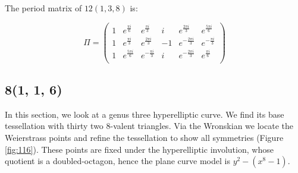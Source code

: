 \documentclass[12pt,reqno]{amsart}
\newtheorem{theorem}{Theorem}
\theoremstyle{definition}
\theoremstyle{remark}
\newtheorem*{remark}{Remark}
\begin{document}


The period matrix of $12(1, 3, 8)$ is: 

$$\Pi = \begin{pmatrix} 1 & e^{\frac{\pi i}{6}} & e^{\frac{\pi i}{3}} & i & e^{\frac{2 \pi i}{3}} & e^{\frac{5 \pi i}{6}} \\
 1 & e^{\frac{\pi i}{3}} & e^{\frac{2 \pi i}{3}} & -1 & e^{-\frac{2 \pi i}{3}} & e^{-\frac{\pi i}{3}} \\
 1 & e^{\frac{5 \pi i}{6}} & e^{-\frac{\pi i}{3}} & i & e^{-\frac{2 \pi i}{3}} & e^{\frac{\pi i}{6}} \\
\end{pmatrix}$$


\subsection*{8(1, 1, 6)}
In this section, we look at a genus three hyperelliptic curve. We find its base tessellation with thirty two 8-valent triangles. Via the Wronskian we locate the Weierstrass points and refine the tessellation to show all symmetries (Figure~ \cref{fig:116}). These points are fixed under the hyperelliptic involution, whose quotient is a doubled-octagon, hence the plane curve model is $y^2 - (x^8 - 1).$ 
\end{document}
